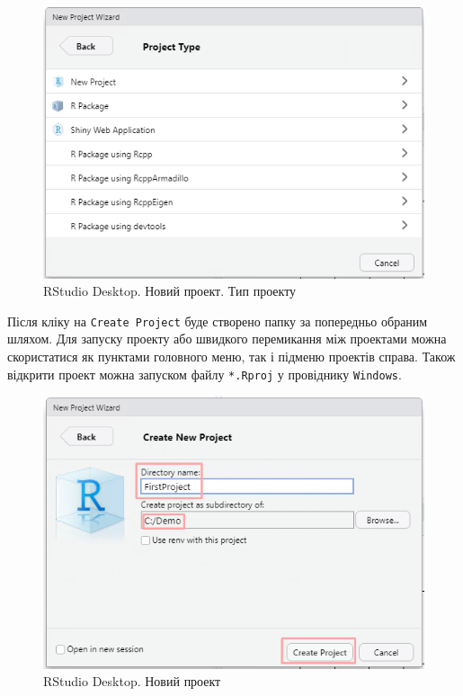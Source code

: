 \documentclass[
]{book}
\begin{document}
\begin{figure}
\includegraphics[width=7.5in]{images/chapter1/rstudio_7} \caption{RStudio Desktop. Новий проект. Тип проекту}\label{fig:unnamed-chunk-18}
\end{figure}

Після кліку на \texttt{Create\ Project} буде створено папку за попередньо обраним шляхом. Для запуску проекту або швидкого перемикання між проектами можна скористатися як пунктами головного меню, так і підменю проектів справа. Також відкрити проект можна запуском файлу \texttt{*.Rproj} у провіднику \texttt{Windows}.

\begin{figure}
\includegraphics[width=7.53in]{images/chapter1/rstudio_8} \caption{RStudio Desktop. Новий проект}\label{fig:unnamed-chunk-19}
\end{figure}
\end{document}
